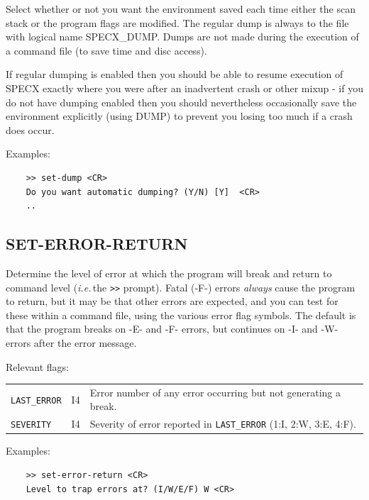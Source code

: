 \documentclass[11pt,twoside]{report}
\newcommand{\ie}{{\it i.e.\,}}
\begin{document}
Select whether or not you want the environment saved each time either the
 scan stack or the program flags are
modified. The regular dump is always to the file with logical name SPECX\_DUMP.
 
Dumps are not made during the execution of a command file
(to save time and disc access). 

If regular dumping is enabled then you should be able to resume execution of
SPECX exactly where you were after an inadvertent crash or other mixup - if you
do not have dumping enabled then you should nevertheless occasionally save the
environment explicitly (using DUMP)  to prevent you losing too much
if a crash does occur. 

Examples:
\begin{verbatim}
    >> set-dump <CR>
    Do you want automatic dumping? (Y/N) [Y]  <CR>
    ..
\end{verbatim}

\subsection{SET-ERROR-RETURN} 

Determine the level of error at which the  program will break and return
to command level (\ie the \verb+>>+ prompt). Fatal (-F-) errors {\em always}
cause the program to return, but it may be that other errors are expected,
and you can test for these within a command file, using the various error
flag symbols. The default is that the program breaks on -E- and -F- errors,
but continues on -I- and -W- errors after the error message.

Relevant flags:\\
\begin{tabular}{lll}
   \verb+LAST_ERROR+ & I4 & Error number of any error occurring but not generating
                            a break.\\
   \verb+SEVERITY+   & I4 & Severity of error reported in \verb+LAST_ERROR+
                            (1:I, 2:W, 3:E, 4:F).
\end{tabular}

Examples:
\begin{verbatim}
    >> set-error-return <CR>
    Level to trap errors at? (I/W/E/F) W <CR>
\end{verbatim}
\end{document}
